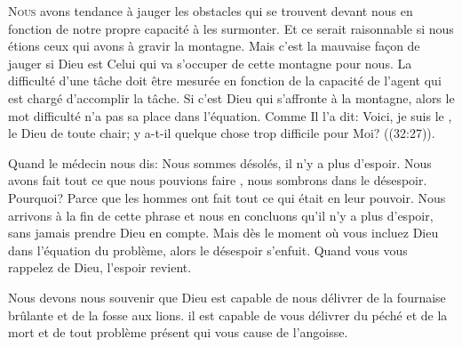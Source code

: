 \dvrule







\lettrine{N}{ous} avons tendance à jauger les obstacles
 qui se trouvent devant nous en fonction de notre propre capacité
 à les surmonter.
 Et ce serait raisonnable si nous étions ceux qui avons
 à gravir la montagne. Mais c'est la mauvaise fa\c{c}on de jauger
 si Dieu est Celui qui va s'occuper de cette montagne pour nous.
 La difficulté d'une tâche doit être mesurée en fonction de la capacité
 de l'agent qui est chargé d'accomplir la tâche.
 Si c'est Dieu qui s'affronte à la montagne, alors le mot
 \Og difficulté \Fg{} n'a pas sa place dans l'équation.
 Comme Il l'a dit: 
 \Og Voici, je suis le \Seigneur, le Dieu de toute chair;
 y a-t-il quelque chose trop difficile pour Moi? \Fg{}
 ((32:27)). 


Quand le médecin nous dis: 
 \Og Nous sommes désolés, il n'y a plus d'espoir.
 Nous avons fait tout ce que nous pouvions faire \Fg{},
 nous sombrons dans le désespoir. Pourquoi?
 Parce que les hommes ont fait tout ce qui était en leur pouvoir.
 Nous arrivons à la fin de cette phrase et nous en concluons
 qu'il n'y a plus d'espoir, sans jamais prendre Dieu en compte.
 Mais dès le moment où vous incluez Dieu
 dans l'équation du problème, alors le désespoir s'enfuit.
 Quand vous vous rappelez de Dieu, l'espoir revient. 

Nous devons nous souvenir que Dieu est capable de nous délivrer
 de la fournaise brûlante et de la fosse aux lions.
 il est capable de vous délivrer du péché et de la mort
 \ocadr et de tout problème présent qui vous cause de l'angoisse.

